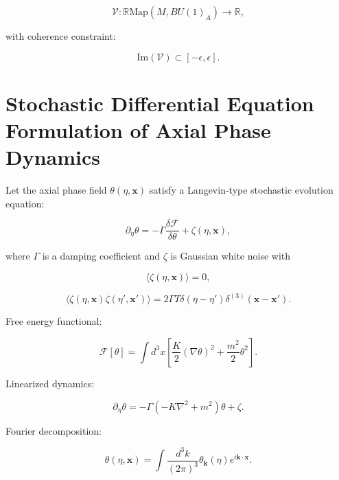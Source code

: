 \documentclass[12pt]{article}
\begin{document}
\begin{equation}
\mathcal{V}:
\mathbb{R}\mathrm{Map}(M,B U(1)_A)
\to
\mathbb{R},
\end{equation}

with coherence constraint:

\begin{equation}
\mathrm{Im}(\mathcal{V})
\subset
[-\epsilon,\epsilon].
\end{equation}

\section{Stochastic Differential Equation Formulation of Axial Phase Dynamics}

Let the axial phase field $\theta(\eta,\mathbf{x})$ satisfy a Langevin-type stochastic evolution equation:

\begin{equation}
\partial_\eta \theta
=
- \Gamma \frac{\delta \mathcal{F}}{\delta \theta}
+
\zeta(\eta,\mathbf{x}),
\end{equation}

where $\Gamma$ is a damping coefficient and $\zeta$ is Gaussian white noise with

\begin{equation}
\langle \zeta(\eta,\mathbf{x}) \rangle = 0,
\end{equation}

\begin{equation}
\langle
\zeta(\eta,\mathbf{x})
\zeta(\eta',\mathbf{x}')
\rangle
=
2\Gamma T
\delta(\eta-\eta')
\delta^{(3)}(\mathbf{x}-\mathbf{x}').
\end{equation}

Free energy functional:

\begin{equation}
\mathcal{F}[\theta]
=
\int d^3x
\left[
\frac{K}{2} (\nabla \theta)^2
+
\frac{m^2}{2} \theta^2
\right].
\end{equation}

Linearized dynamics:

\begin{equation}
\partial_\eta \theta
=
- \Gamma ( -K\nabla^2 + m^2 ) \theta
+
\zeta.
\end{equation}

Fourier decomposition:

\begin{equation}
\theta(\eta,\mathbf{x})
=
\int \frac{d^3k}{(2\pi)^3}
\theta_{\mathbf{k}}(\eta)
e^{i\mathbf{k}\cdot\mathbf{x}}.
\end{equation}
\end{document}
